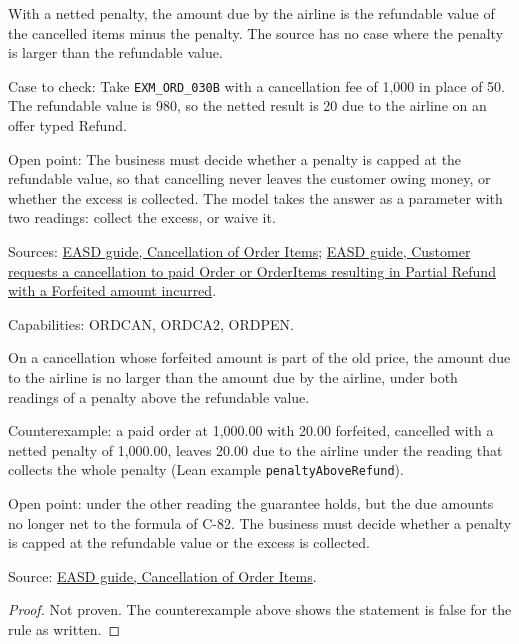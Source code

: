 \begin{definition}
  \label{def:change-cancellation-penalty-exceeds-refund}
  With a netted penalty, the amount due by the airline is the refundable
  value of the cancelled items minus the penalty. The source has no case
  where the penalty is larger than the refundable value.

  Case to check: Take \texttt{EXM\_ORD\_030B} with a cancellation fee of
  1,000 in place of 50. The refundable value is 980, so the netted result is
  20 due to the airline on an offer typed Refund.

  Open point: The business must decide whether a penalty is capped at the
  refundable value, so that cancelling never leaves the customer owing
  money, or whether the excess is collected. The model takes the answer as a
  parameter with two readings: collect the excess, or waive it.

  Sources: \href{https://standards.atlassian.net/wiki/spaces/EASD/pages/574783569}{EASD guide, Cancellation of Order Items};
  \href{https://standards.atlassian.net/wiki/spaces/EASD/pages/817594543}{EASD guide, Customer requests a cancellation to paid Order or OrderItems resulting in Partial Refund with a Forfeited amount incurred}.

  Capabilities: ORDCAN, ORDCA2, ORDPEN.
\end{definition}

\begin{theorem}
  \label{thm:change-cancellation-cancel-not-owing}
  On a cancellation whose forfeited amount is part of the old price, the
  amount due to the airline is no larger than the amount due by the airline,
  under both readings of a penalty above the refundable value.

  Counterexample: a paid order at 1,000.00 with 20.00 forfeited, cancelled
  with a netted penalty of 1,000.00, leaves 20.00 due to the airline under the
  reading that collects the whole penalty (Lean example
  \texttt{penaltyAboveRefund}).

  Open point: under the other reading the guarantee holds, but the due
  amounts no longer net to the formula of C-82.  The business must decide
  whether a penalty is capped at the refundable value or the excess is
  collected.

  Source: \href{https://standards.atlassian.net/wiki/spaces/EASD/pages/574783569/Cancellation+of+Order+Items}{EASD guide, Cancellation of Order Items}.
\end{theorem}
\begin{proof}
  Not proven.  The counterexample above shows the statement is false for the
  rule as written.
\end{proof}

